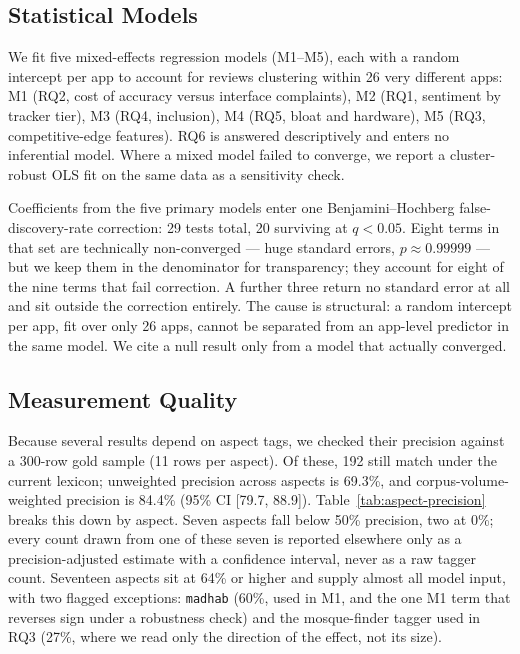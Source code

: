\subsection{Statistical Models}
\label{sec:method-models}

We fit five mixed-effects regression models (M1--M5), each with a random
intercept per app to account for reviews clustering within 26 very different
apps: M1 (RQ2, cost of accuracy versus interface complaints), M2 (RQ1,
sentiment by tracker tier), M3 (RQ4, inclusion), M4 (RQ5, bloat and hardware),
M5 (RQ3, competitive-edge features). RQ6 is answered descriptively and enters
no inferential model. Where a mixed model failed to converge, we report a
cluster-robust OLS fit on the same data as a sensitivity check.

Coefficients from the five primary models enter one Benjamini--Hochberg
false-discovery-rate correction: 29 tests total, 20 surviving at
\(q < 0.05\). Eight terms in that set are technically non-converged --- huge
standard errors, \(p \approx 0.99999\) --- but we keep them in the denominator
for transparency; they account for eight of the nine terms that fail
correction. A further three return no standard error at all and sit outside
the correction entirely. The cause is structural: a random intercept per app,
fit over only 26 apps, cannot be separated from an app-level predictor in the
same model. We cite a null result only from a model that actually converged.

\subsection{Measurement Quality}
\label{sec:method-measurement}

Because several results depend on aspect tags, we checked their precision
against a 300-row gold sample (11 rows per aspect). Of these, 192 still match
under the current lexicon; unweighted precision across aspects is 69.3\%, and
corpus-volume-weighted precision is 84.4\% (95\% CI [79.7, 88.9]).
Table~\ref{tab:aspect-precision} breaks this down by aspect. Seven aspects fall
below 50\% precision, two at 0\%; every count drawn from one of these seven is
reported elsewhere only as a precision-adjusted estimate with a confidence
interval, never as a raw tagger count. Seventeen aspects sit at 64\% or higher
and supply almost all model input, with two flagged exceptions:
\texttt{madhab} (60\%, used in M1, and the one M1 term that reverses sign under
a robustness check) and the mosque-finder tagger used in RQ3 (27\%, where we
read only the direction of the effect, not its size).


